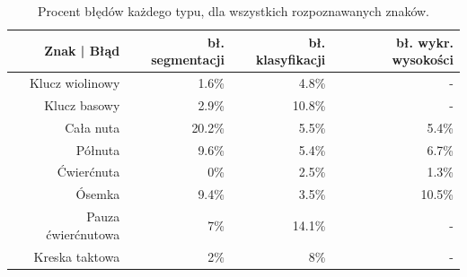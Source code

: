 \documentclass[a4paper,11pt]{article}
\begin{document}
\begin{table}
\centering
\begin{tabular}{|r|r|r|r|}
\hline
Znak | Błąd & bł. segmentacji & bł. klasyfikacji & bł. wykr. wysokości \\ \hline
Klucz wiolinowy & 1.6\% & 4.8\% & - \\
Klucz basowy & 2.9\% & 10.8\% & - \\
Cała nuta & 20.2\% & 5.5\% & 5.4\%\\
Półnuta & 9.6\% & 5.4\% & 6.7\% \\
Ćwierćnuta & 0\% & 2.5\% & 1.3\% \\
Ósemka & 9.4\% & 3.5\% & 10.5\% \\
Pauza ćwierćnutowa & 7\% & 14.1\% & - \\
Kreska taktowa & 2\% & 8\% & - \\ \hline

\end{tabular}
\caption{Procent błędów każdego typu, dla wszystkich rozpoznawanych znaków.}
\label{tab:test_results}
\end{table}





\end{document}
